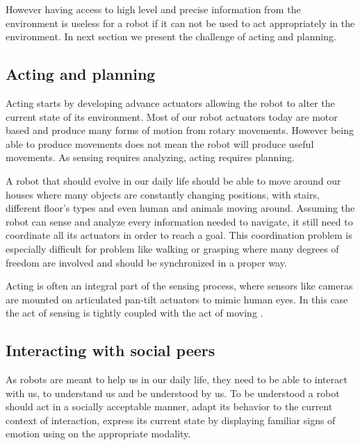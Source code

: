 \transition

However having access to high level and precise information from the environment is useless for a robot if it can not be used to act appropriately in the environment. In next section we present the challenge of acting and planning.

\subsection{Acting and planning}


Acting starts by developing advance actuators allowing the robot to alter the current state of its environment. Most of our robot actuators today are motor based and produce many forms of motion from rotary movements. However being able to produce movements does not mean the robot will produce useful movements. As sensing requires analyzing, acting requires planning.

A robot that should evolve in our daily life should be able to move around our houses where many objects are constantly changing positions, with stairs, different floor's types and even human and animals moving around. Assuming the robot can sense and analyze every information needed to navigate, it still need to coordinate all its actuators in order to reach a goal. This coordination problem is especially difficult for problem like walking \cite{kajita20013d,lapeyre2011maturational} or grasping \cite{bicchi2000robotic} where many degrees of freedom are involved and should be synchronized in a proper way.

Acting is often an integral part of the sensing process, where sensors like cameras are mounted on articulated pan-tilt actuators to mimic human eyes. In this case the act of sensing is tightly coupled with the act of moving \cite{bajcsy1988active,lonini2013robust}.

\subsection{Interacting with social peers}


As robots are meant to help us in our daily life, they need to be able to interact with us, to understand us and be understood by us. To be understood a robot should act in a socially acceptable manner, adapt its behavior to the current context of interaction, express its current state by displaying familiar signs of emotion using on the appropriate modality.

